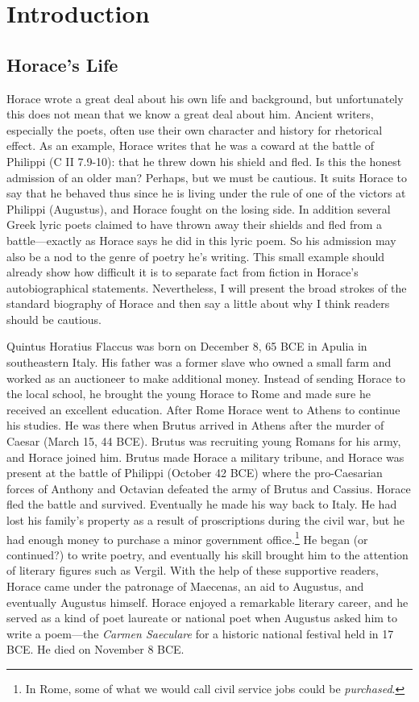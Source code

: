 \chapter*{Introduction}

\section*{Horace's Life}

Horace wrote a great deal about his own life and background, but unfortunately this does not mean that we know a great deal about him.  Ancient writers, especially the poets, often use their own character and history for rhetorical effect.  As an example, Horace writes that he was a coward at the battle of Philippi (C II 7.9-10): that he threw down his shield and fled. Is this the honest admission of an older man? Perhaps, but we must be cautious.  It suits Horace to say that he behaved thus since he is living under the rule of one of the victors at Philippi (Augustus), and Horace fought on the losing side.  In addition several Greek lyric poets claimed to have thrown away their shields and fled from a battle---exactly as Horace says he did in this lyric poem.  So his admission may also be a nod to the genre of poetry he's writing.  This small example should already show how difficult it is to separate fact from fiction in Horace's autobiographical statements.  Nevertheless, I will present the broad strokes of the standard biography of Horace and then say a little about why I think readers should be cautious.

Quintus Horatius Flaccus was born on December 8, 65 BCE in Apulia in southeastern Italy.  His father was a former slave who owned a small farm and worked as an auctioneer to make additional money.  Instead of sending Horace to the local school, he brought the young Horace to Rome and made sure he received an excellent education.  After Rome Horace went to Athens to continue his studies.  He was there when Brutus arrived in Athens after the murder of Caesar (March 15, 44 BCE).  Brutus was recruiting young Romans for his army, and Horace joined him.  Brutus made Horace a military tribune, and Horace was present at the battle of Philippi (October 42 BCE) where the pro-Caesarian forces of Anthony and Octavian defeated the army of Brutus and Cassius.  Horace fled the battle and survived.  Eventually he made his way back to Italy.  He had lost his family's property as a result of proscriptions during the civil war, but he had enough money to purchase a minor government office.\footnote{In Rome, some of what we would call civil service jobs could be \textit{purchased}.}  He began (or continued?) to write poetry, and eventually his skill brought him to the attention of literary figures such as Vergil.  With the help of these supportive readers, Horace came under the patronage of Maecenas, an aid to Augustus, and eventually Augustus himself.  Horace enjoyed a remarkable literary career, and he served as a kind of poet laureate or national poet when Augustus asked him to write a poem---the \textit{Carmen Saeculare} for a historic national festival held in 17 BCE.  He died on November 8 BCE.

